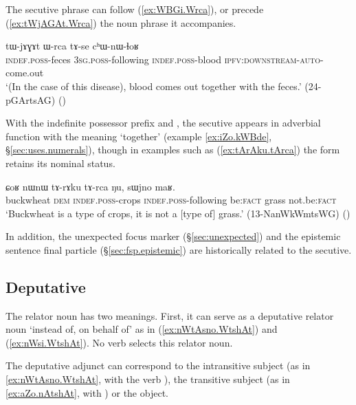 The secutive phrase can follow  (\ref{ex:WBGi.Wrca}), or precede (\ref{ex:tWjAGAt.Wrca}) the noun phrase it accompanies.

\begin{exe}
\ex \label{ex:tWjAGAt.Wrca}
 \gll   tɯ-jɤɣɤt ɯ-rca tɤ-se cʰɯ-nɯ-ɬoʁ \\
 \textsc{indef}.\textsc{poss}-feces \textsc{3sg}.\textsc{poss}-following \textsc{indef}.\textsc{poss}-blood \textsc{ipfv}:\textsc{downstream}-\textsc{auto}-come.out \\
 \glt `(In the case of this disease), blood comes out together with the feces.' (24-pGArtsAG) 	()
 \end{exe}

With the indefinite possessor prefix  and  , the secutive appears in adverbial function with the meaning `together' (example \ref{ex:iZo.kWBde}, §\ref{sec:uses.numerals}), though in examples such as  (\ref{ex:tArAku.tArca}) the form   retains its nominal status.


\begin{exe}
\ex \label{ex:tArAku.tArca}
 \gll ɕoʁ nɯnɯ tɤ-rɤku tɤ-rca ŋu, sɯjno maʁ. \\
 buckwheat \textsc{dem} \textsc{indef}.\textsc{poss}-crops \textsc{indef}.\textsc{poss}-following be:\textsc{fact} grass not.be:\textsc{fact} \\
 \glt `Buckwheat is a type of crops, it is not a [type of] grass.' (13-NanWkWmtsWG) ()
\end{exe}

In addition, the unexpected focus marker  (§\ref{sec:unexpected}) and the epistemic sentence final particle  (§\ref{sec:fsp.epistemic}) are historically related to the secutive.
 
\subsection{Deputative} \label{sec:deputative} 
The relator noun  has two meanings. First, it can serve as a deputative relator noun `instead of, on behalf of' as in (\ref{ex:nWtAsno.WtshAt}) and (\ref{ex:nWsi.WtshAt}). No verb selects this relator noun. 

The deputative adjunct can correspond to the intransitive subject (as in \ref{ex:nWtAsno.WtshAt}, with the verb ), the transitive subject (as in \ref{ex:aZo.nAtshAt}, with ) or the object.

